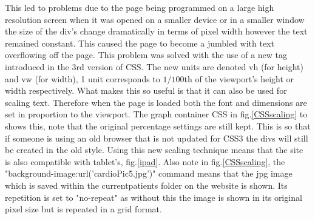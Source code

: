 \documentclass[11pt]{article}
\begin{document}
This led to problems due to the page being programmed on a large high resolution screen when it was opened on a smaller device or in a smaller window the size of the div's change dramatically in terms of pixel width however the text remained constant. This caused the page to become a jumbled with text overflowing off the page. This problem was solved with the use of a new tag introduced in the 3rd version of CSS. The new units are denoted vh (for height) and vw (for width), 1 unit corresponds to $1/100$th of the viewport's height or width respectively. What makes this so useful is that it can also be used for scaling text. Therefore when the page is loaded both the font and dimensions are set in proportion to the viewport. The graph container CSS in fig.\ref{CSSscaling} to shows this, note that the original percentage settings are still kept. This is so that if someone is using an old browser that is not updated for CSS3 the divs will still be created in the old style. Using this new scaling technique means that the site is also compatible with tablet's, fig.\ref{ipad}. Also note in fig.\ref{CSSscaling}, the "background-image:url('cardioPic5.jpg')" command means that the jpg image which is saved within the currentpatients folder on the website is shown. Its repetition is set to "no-repeat" as without this the image is shown in its original pixel size but is repeated in a grid format. 
\end{document}

